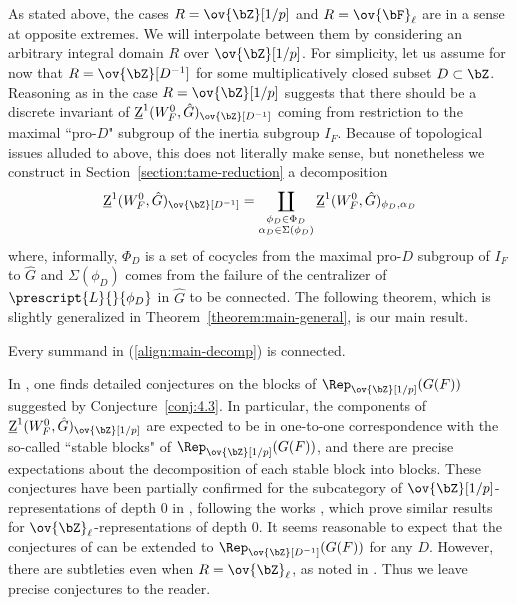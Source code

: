 As stated above, the cases $R = \ov{\bZ}[1/p]$ and $R = \ov{\bF}_{\ell}$ are in a sense at opposite extremes. We will interpolate between them by considering an arbitrary integral domain $R$ over $\ov{\bZ}[1/p]$. For simplicity, let us assume for now that $R = \ov{\bZ}[D^{-1}]$ for some multiplicatively closed subset $D \subset \bZ$. Reasoning as in the case $R = \ov{\bZ}[1/p]$ suggests that there should be a discrete invariant of $\underline{\rm{Z}}^1(W_F^0, \hat{G})_{\ov{\bZ}[D^{-1}]}$ coming from restriction to the maximal ``pro-$D$" subgroup of the inertia subgroup $I_F$. Because of topological issues alluded to above, this does not literally make sense, but nonetheless we construct in Section~\ref{section:tame-reduction} a decomposition
\begin{align}\label{align:main-decomp}
\underline{\rm{Z}}^1(W_F^0, \hat{G})_{\ov{\bZ}[D^{-1}]} = \coprod_{\substack{\phi_D \in \Phi_D \\ \alpha_D \in \Sigma(\phi_D)}} \underline{\rm{Z}}^1(W_F^0, \hat{G})_{\phi_D, \alpha_D}
\end{align}
where, informally, $\Phi_D$ is a set of cocycles from the maximal pro-$D$ subgroup of $I_F$ to $\hat{G}$ and $\Sigma(\phi_D)$ comes from the failure of the centralizer of $\prescript{L}{}{\phi_D}$ in $\hat{G}$ to be connected. The following theorem, which is slightly generalized in Theorem~\ref{theorem:main-general}, is our main result.

\begin{theorem}\label{theorem:intro-MAIN-main}
    Every summand in (\ref{align:main-decomp}) is connected.
\end{theorem}

In \cite[\S 4.5]{Dat-notes}, one finds detailed conjectures on the blocks of $\Rep_{\ov{\bZ}[1/p]}(G(F))$ suggested by Conjecture~\ref{conj:4.3}. In particular, the components of $\underline{\rm{Z}}^1(W_F^0, \hat{G})_{\ov{\bZ}[1/p]}$ are expected to be in one-to-one correspondence with the so-called ``stable blocks" of $\Rep_{\ov{\bZ}[1/p]}(G(F))$, and there are precise expectations about the decomposition of each stable block into blocks. These conjectures have been partially confirmed for the subcategory of $\ov{\bZ}[1/p]$-representations of depth $0$ in \cite{Dat-Lanard}, following the works \cite{Lanard1}, \cite{Lanard2} which prove similar results for $\ov{\bZ}_{\ell}$-representations of depth $0$. It seems reasonable to expect that the conjectures of \cite[\S 4.5]{Dat-notes} can be extended to $\Rep_{\ov{\bZ}[D^{-1}]}(G(F))$ for any $D$. However, there are subtleties even when $R = \ov{\bZ}_{\ell}$, as noted in \cite[\S 4.7]{Dat-notes}. Thus we leave precise conjectures to the reader.\smallskip

